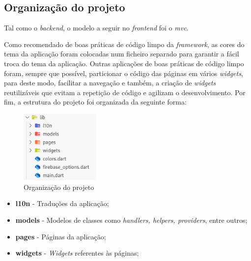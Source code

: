 \subsection{Organização do projeto}
Tal como o \textit{backend}, o modelo a seguir no \textit{frontend} foi o \textit{\acrshort{mvc}}. 

Como recomendado de boas práticas de código limpo da \textit{framework}, as cores do tema da aplicação foram colocadas num ficheiro separado para garantir a fácil troca do tema da aplicação. Outras aplicações de boas práticas de código limpo foram, sempre que possível, particionar o código das páginas em vários \textit{widgets}, para deste modo, facilitar a navegação e também, a criação de \textit{widgets} reutilizáveis que evitam a repetição de código e agilizam o desenvolvimento. Por fim, a estrutura do projeto foi organizada da seguinte forma:
\begin{figure}[htb]
 \centering
 \includegraphics[width=0.35\textwidth]{images/implementacao/frontend/organizacao_projeto.png}
 \caption{Organização do projeto}
 \label{fig:69}
\end{figure}

\begin{itemize}
 \item \textbf{l10n} - Traduções da aplicação;
 \item \textbf{models} - Modelos de classes como \textit{handlers, helpers, providers}, entre outros;
 \item \textbf{pages} - Páginas da aplicação;
 \item \textbf{widgets} - \textit{Widgets} referentes às páginas;
\end{itemize}
\vspace{50mm}

